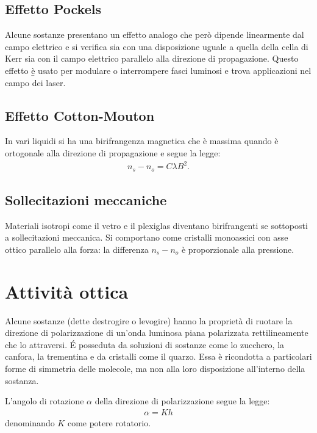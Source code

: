 \subsection{Effetto Pockels}
Alcune sostanze presentano un effetto analogo che però dipende linearmente dal campo elettrico e si verifica sia con una disposizione uguale a quella della cella di Kerr sia con il campo elettrico parallelo alla direzione di propagazione. Questo effetto \b{è usato per modulare o interrompere fasci luminosi} e trova applicazioni nel campo dei laser.

\subsection{Effetto Cotton-Mouton}
In vari liquidi si ha una birifrangenza magnetica che è massima quando \dB è ortogonale alla direzione di propagazione e segue la legge:
\begin{equation}\begin{split}
n_s-n_o=C\lambda B^2.
\end{split}\end{equation}

\subsection{Sollecitazioni meccaniche}
Materiali isotropi come il vetro e il plexiglas diventano birifrangenti se sottoposti a sollecitazioni meccanica. Si comportano come cristalli monoassici con asse ottico parallelo alla forza: la differenza $n_s-n_o$ è proporzionale alla pressione.

\section{Attività ottica}%
Alcune sostanze (dette destrogire o levogire) hanno la proprietà di ruotare la direzione di polarizzazione di un'onda luminosa piana polarizzata rettilineamente che lo attraversi. \'E posseduta da soluzioni di sostanze come lo zucchero, la canfora, la trementina e da cristalli come il quarzo. Essa è ricondotta a particolari forme di simmetria delle molecole, ma non alla loro disposizione all'interno della sostanza.

L'angolo di rotazione $\alpha$ della direzione di polarizzazione segue la legge:
\begin{equation}\begin{split}
\alpha=Kh
\end{split}\end{equation}
denominando $K$ come \b{potere rotatorio}.

